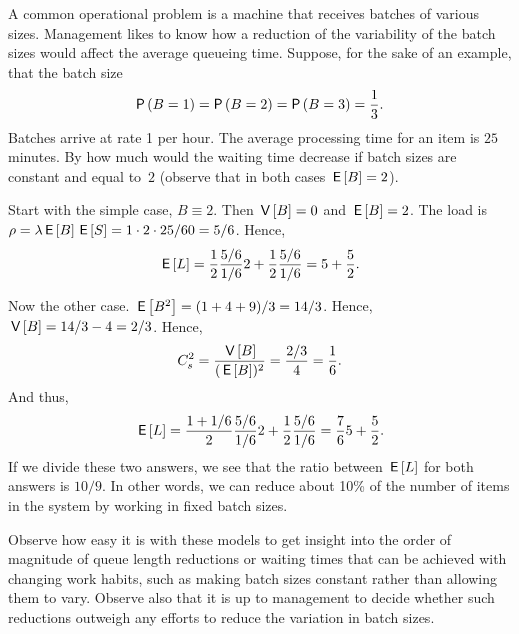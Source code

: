 \begin{exercise}
  A common operational problem is a machine that receives batches of
  various sizes. Management likes to know how a reduction of the
  variability of the batch sizes would affect the average queueing time.
  Suppose, for the sake of an example, that the batch size 
  \begin{equation*}
    \P{B=1} = \P{B=2} = \P{B=3} = \frac 13.
  \end{equation*}
  Batches arrive at rate 1 per hour. The average processing time for an
  item is $25$ minutes.  By how much would the waiting time decrease if
  batch sizes are constant and equal to~$2$ (observe that in both cases $\,\mathsf{E}\left[B\right] =2$).
  \begin{solution}
    Start with the simple case, $B\equiv 2$. Then $\,\mathsf{V}\left[B\right]=0$ and
    $\,\mathsf{E}\left[B\right] = 2$. The load is $\rho=\lambda \,\mathsf{E}\left[B\right] \,\mathsf{E}\left[S\right] = 1\cdot 2 \cdot 25/60 = 5/6$.  Hence,
    \begin{equation*}
      \,\mathsf{E}\left[L\right] = \frac 12 \frac{5/6}{1/6} 2 + \frac 12 \frac{5/6}{1/6} = 5 + \frac52.
    \end{equation*}

Now the other case. $\,\mathsf{E}\left[B^2\right] = (1+4+9)/3 = 14/3$. Hence, $\,\mathsf{V}\left[B\right]=14/3 - 4=2/3$. Hence, 
\begin{equation*}
C_s^2=\frac{\,\mathsf{V}\left[B\right]}{(\,\mathsf{E}\left[B\right])^2} = \frac{2/3}4 = \frac 16.
\end{equation*}
And thus, 
    \begin{equation*}
      \,\mathsf{E}\left[L\right] = \frac {1+1/6}2 \frac{5/6}{1/6} 2 + \frac 12 \frac{5/6}{1/6} = \frac76 5 + \frac 52.
    \end{equation*}
    If we divide these two answers, we see that the ratio between
    $\,\mathsf{E}\left[L\right]$ for both answers is $10/9$. In other words, we can
    reduce about 10\% of the number of items in the system by working
    in fixed batch sizes. 
  \end{solution}
\end{exercise}

Observe how easy it is with these models to get insight into the order
of magnitude of queue length reductions or waiting times that can be
achieved with changing work habits, such as making batch sizes constant
rather than allowing them to vary. Observe also that it is up to
management to decide whether such reductions outweigh any efforts to
reduce the variation in batch sizes. 


